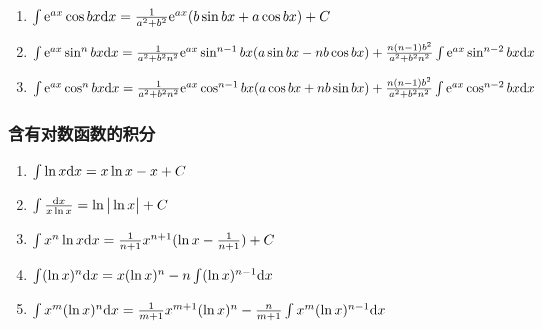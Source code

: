 \begin{small}
\begin{enumerate}
\item $ \int \mathrm{e} ^{ax} \cos bx \mathrm{d} x = \frac{1}{a^2+b^2}\mathrm{e} ^{ax}(b \sin bx + a \cos bx)+C $

\item $ \int \mathrm{e} ^{ax} \sin ^ n bx \mathrm{d} x=\frac{1}{a^2+b^2 n^2}\mathrm{e} ^{ax} \sin ^ {n-1} bx (a \sin bx -nb \cos bx) +\frac{n(n-1)b^2}{a^2+b^2 n^2}\int \mathrm{e} ^{ax} \sin ^{n-2} bx \mathrm{d} x $

\item $ \int \mathrm{e} ^{ax} \cos ^ n bx \mathrm{d} x=\frac{1}{a^2+b^2 n^2}\mathrm{e} ^{ax} \cos ^ {n-1} bx (a \cos bx +nb \sin bx) +\frac{n(n-1)b^2}{a^2+b^2 n^2}\int \mathrm{e} ^{ax} \cos ^{n-2} bx \mathrm{d} x $

\end{enumerate}

\subsubsection{含有对数函数的积分}

\begin{enumerate}

\item $ \int \ln x \mathrm{d} x = x \ln x - x + C$

\item $ \int \frac{\mathrm{d} x}{x \ln x} =\ln \big | \ln x \big |+C $

\item $ \int x^n \ln x \mathrm{d} x = \frac{1}{n+1}x^{n+1}(\ln x - \frac{1}{n+1} ) +C $

\item $ \int (\ln x)^{n} \mathrm{d} x = x(\ln x)^ n - n \int (\ln x)^{n-1} \mathrm{d} x $

\item $ \int x ^ m(\ln x)^n \mathrm{d} x=\frac{1}{m+1}x^{m+1} (\ln x)^n - \frac{n}{m+1} \int x^m(\ln x)^{n-1}\mathrm{d} x $ 

\end{enumerate}

\end{small}